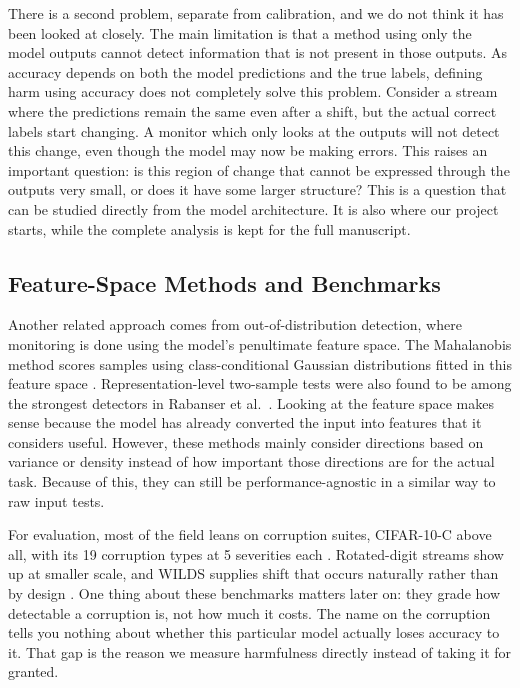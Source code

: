 \documentclass[graybox]{SNmult}
\begin{document}
There is a second problem, separate from calibration, and we do not
think it has been looked at closely. The main limitation is that a method using only the model outputs cannot detect information that is not present in those outputs. As accuracy depends on both the model predictions and the true labels, defining harm using accuracy does not completely solve this problem. Consider a stream where the predictions remain the same even after a shift, but the actual correct labels start changing. A monitor which only looks at the outputs will not detect this change, even though the model may now be making errors. This raises an important question: is this region of change that cannot be expressed through the outputs very small, or does it have some larger structure? This is a question that can be studied directly from the model architecture. It is also where our project starts, while the complete analysis is kept for the full manuscript.

\subsection{Feature-Space Methods and Benchmarks}

Another related approach comes from out-of-distribution detection, where monitoring is done using the model's penultimate feature space. The Mahalanobis method scores samples using class-conditional Gaussian distributions fitted in this feature space \cite{lee2018mahalanobis}. Representation-level two-sample tests were also found to be among the strongest detectors in Rabanser et al.\
\cite{rabanser2019failing}. Looking at the feature space makes sense because the model has already converted the input into features that it considers useful. However, these methods mainly consider directions based on variance or density instead of how important those directions are for the actual task. Because of this, they can still be performance-agnostic in a similar way to raw input tests.

For evaluation, most of the field leans on corruption suites, CIFAR-10-C
above all, with its 19 corruption types at 5 severities each
\cite{hendrycks2019benchmarking}. Rotated-digit streams show up at
smaller scale, and WILDS supplies shift that occurs naturally rather
than by design \cite{koh2021wilds}. One thing about these benchmarks
matters later on: they grade how detectable a corruption is, not how
much it costs. The name on the corruption tells you nothing about
whether this particular model actually loses accuracy to it. That gap is
the reason we measure harmfulness directly instead of taking it for
granted.
\end{document}
